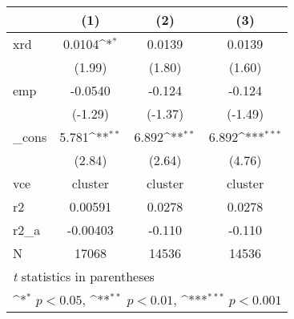 {
\def\sym#1{\ifmmode^{#1}\else\(^{#1}\)\fi}
\begin{tabular}{l*{3}{c}}
\hline\hline
            &\multicolumn{1}{c}{(1)}         &\multicolumn{1}{c}{(2)}         &\multicolumn{1}{c}{(3)}         \\
\hline
xrd         &      0.0104\sym{*}  &      0.0139         &      0.0139         \\
            &      (1.99)         &      (1.80)         &      (1.60)         \\
[1em]
emp         &     -0.0540         &      -0.124         &      -0.124         \\
            &     (-1.29)         &     (-1.37)         &     (-1.49)         \\
[1em]
\_cons      &       5.781\sym{**} &       6.892\sym{**} &       6.892\sym{***}\\
            &      (2.84)         &      (2.64)         &      (4.76)         \\
\hline
vce         &     cluster         &     cluster         &     cluster         \\
r2          &     0.00591         &      0.0278         &      0.0278         \\
r2\_a        &    -0.00403         &      -0.110         &      -0.110         \\
N           &       17068         &       14536         &       14536         \\
\hline\hline
\multicolumn{4}{l}{\footnotesize \textit{t} statistics in parentheses}\\
\multicolumn{4}{l}{\footnotesize \sym{*} \(p<0.05\), \sym{**} \(p<0.01\), \sym{***} \(p<0.001\)}\\
\end{tabular}
}
